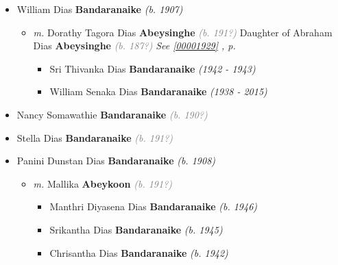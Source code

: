 \documentclass[10pt, openany]{book}
\begin{document}
\begin{itemize}
{\begin{itemize}
{\begin{itemize}
{\begin{itemize}
{\begin{itemize}
\item{William Dias \textbf{Bandaranaike} \textcolor{slorange}{\textit{(b. 1907)}}
\begin{itemize}
\item{\textit{m.} Dorathy Tagora Dias \textbf{Abeysinghe} \textcolor{gray}{\textit{(b. 191?)}} Daughter of  Abraham Dias \textbf{Abeysinghe} \textcolor{gray}{\textit{(b. 187?)}} \textcolor{slteal}{\textit{See  \autoref{00001929} \textit{, p. \pageref{00001929} }}}   \label{couple:00001927:00001928} \begin{itemize}
\item{Sri Thivanka Dias \textbf{Bandaranaike} \textcolor{slorange}{\textit{(1942 - 1943)}}
   }
\item{William Senaka Dias \textbf{Bandaranaike} \textcolor{slorange}{\textit{(1938 - 2015)}}
   }
\end{itemize}}
\end{itemize}
  }
\item{Nancy Somawathie \textbf{Bandaranaike} \textcolor{gray}{\textit{(b. 190?)}}
  }
\item{Stella Dias \textbf{Bandaranaike} \textcolor{gray}{\textit{(b. 191?)}}
  }
\item{Panini Dunstan Dias \textbf{Bandaranaike} \textcolor{slorange}{\textit{(b. 1908)}}
\begin{itemize}
\item{\textit{m.} Mallika \textbf{Abeykoon} \textcolor{gray}{\textit{(b. 191?)}}   \label{couple:00001933:00001934} \begin{itemize}
\item{Manthri Diyasena Dias \textbf{Bandaranaike} \textcolor{slorange}{\textit{(b. 1946)}}
   }
\item{Srikantha Dias \textbf{Bandaranaike} \textcolor{slorange}{\textit{(b. 1945)}}
  }
\item{Chrisantha Dias \textbf{Bandaranaike} \textcolor{slorange}{\textit{(b. 1942)}}
  }
\end{itemize}}
\end{itemize}
   }
\end{itemize}}

\end{itemize}}
\end{itemize}}
\end{itemize}}
\end{itemize}
\end{document}
